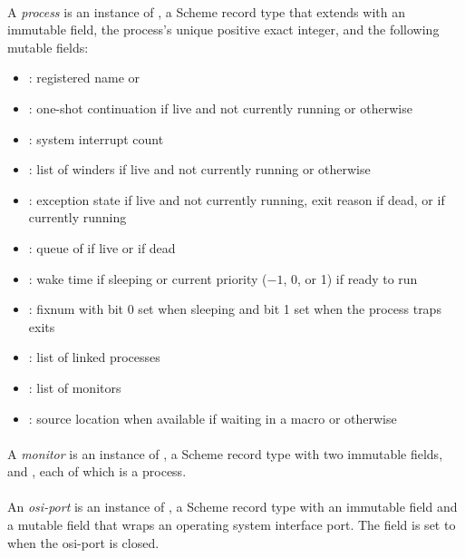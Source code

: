 \paragraph {}
A \emph{process} is an instance of , a Scheme record type
that extends  with an immutable  field, the
process's unique positive exact integer, and the following mutable
fields:
\begin{itemize}
\item {}: registered name or 
\item {}: one-shot continuation if live and not currently
  running or  otherwise
\item {}: system interrupt count
\item {}: list of winders if live and not currently
  running or \code{()} otherwise
\item {}: exception state if live and not
  currently running, exit reason if dead, or  if currently
  running
\item {}: queue of  if live or  if
  dead
\item {}: wake time if sleeping or current priority
  ($-1$, 0, or 1) if ready to run
\item {}: fixnum with bit 0 set when sleeping and bit 1
  set when the process traps exits
\item {}: list of linked processes
\item {}: list of monitors
\item {}: source location  when available if waiting in a 
  macro or  otherwise
\end{itemize}

\paragraph {}
A \emph{monitor} is an instance of , a Scheme record type
with two immutable fields,  and , each
of which is a process.

\paragraph {}
An \emph{osi-port} is an instance of , a Scheme
record type with an immutable  field and a mutable
 field that wraps an operating system interface
port. The  field is set to  when the
osi-port is closed.

